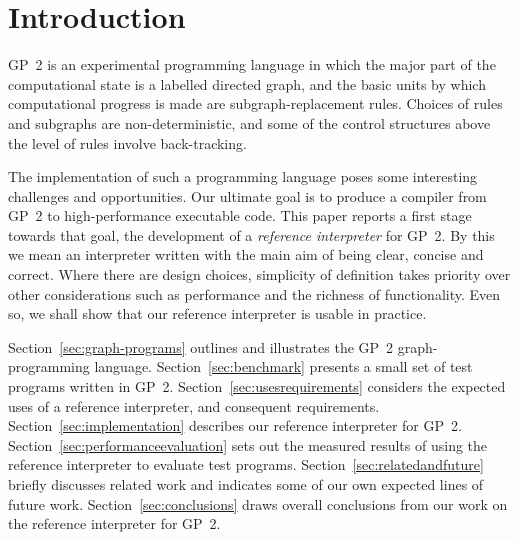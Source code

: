 \section{Introduction}

GP~2 is an experimental programming language in which the major part of
the computational state is a labelled directed graph, and the basic
units by which computational progress is made are subgraph-replacement
rules.
Choices of rules and subgraphs are non-deterministic, and some of
the control structures above the level of rules involve back-tracking.

The implementation of such a programming language poses some
interesting challenges and opportunities.
Our ultimate goal is to produce a compiler from GP~2 to
high-performance executable code.
This paper reports a first stage towards that goal, the development
of a \emph{reference interpreter} for GP~2.
By this we mean an interpreter written with the main aim of
being clear, concise and correct.
Where there are design choices, simplicity of
definition takes priority over other considerations
such as performance and the richness of functionality.
Even so, we shall show that our reference interpreter is usable
in practice.

Section~\ref{sec:graph-programs} outlines and illustrates the GP~2
graph-programming language.
Section~\ref{sec:benchmark} presents a small set of test programs
written in GP~2.
Section~\ref{sec:usesrequirements} considers the expected uses of
a reference interpreter, and consequent requirements.
Section~\ref{sec:implementation} describes our reference interpreter for
GP~2.
Section~\ref{sec:performanceevaluation} sets out the measured results of using the reference
interpreter to evaluate test programs.
Section~\ref{sec:relatedandfuture} briefly discusses related work and
indicates some of our own expected lines of future work.
Section~\ref{sec:conclusions} draws overall conclusions from our work
on the reference interpreter for GP~2.

